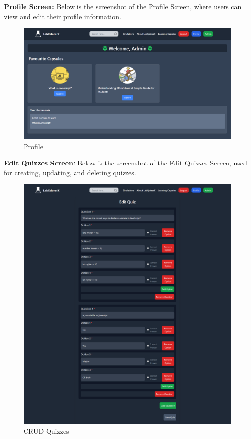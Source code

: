 \textbf{Profile Screen:} Below is the screenshot of the Profile Screen, where users can view and edit their profile information.
\begin{figure}[H]
    \centering
    \includegraphics[width = 15cm]{Diagrams/output/profile.png}
    \caption{Profile}
\end{figure}

\textbf{Edit Quizzes Screen:} Below is the screenshot of the Edit Quizzes Screen, used for creating, updating, and deleting quizzes.
\begin{figure}[H]
    \centering
    \includegraphics[width = 16cm]{Diagrams/output/edit_quiz.png}
    \caption{CRUD Quizzes}
\end{figure}
\newpage

